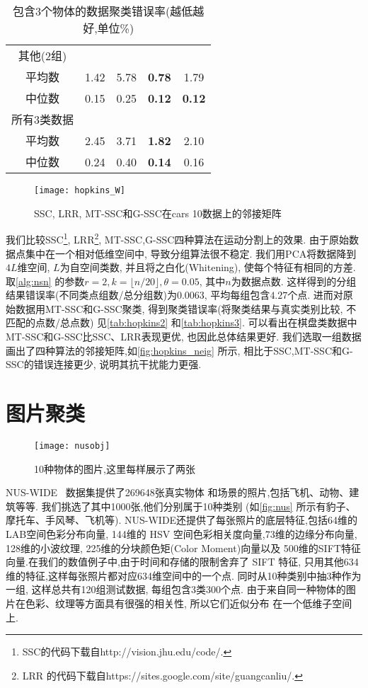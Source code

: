 \begin{table}[!htb]
\begin{tabular}{|c|c|c|c|c|}
	其他(2组)  &      &      &               &               \\
	平均数     & 1.42 & 5.78 & \textbf{0.78} & 1.79          \\
	中位数     & 0.15 & 0.25 & \textbf{0.12} & \textbf{0.12} \\ \hline
	所有3类数据  &      &      &               &               \\
	平均数     & 2.45 & 3.71 & \textbf{1.82} & 2.10 \\
    中位数     & 0.24 & 0.40 & \textbf{0.14}  & 0.16  \\ \hline
  \end{tabular}
  \caption{包含3个物体的数据聚类错误率(越低越好,单位\%)}
  \label{tab:hopkins3}
\end{table}

\begin{figure}[tb]
  \centering
  \texttt{[image: hopkins\_W]}
  \caption{SSC, LRR, MT-SSC和G-SSC在cars 10数据上的邻接矩阵}
  \label{fig:hopkins_neig}
\end{figure}
我们比较SSC\footnote{SSC的代码下载自http://vision.jhu.edu/code/.},
LRR\footnote{LRR 的代码下载自https://sites.google.com/site/guangcanliu/.},
MT-SSC,G-SSC四种算法在运动分割上的效果.
由于原始数据点集中在一个相对低维空间中, 导致分组算法很不稳定.
我们用PCA将数据降到\(4L\)维空间, \(L\)为自空间类数, 并且将之白化(Whitening),
使每个特征有相同的方差. 
取\autoref{alg:nsn} 的参数\(r=2, k=\lfloor n/20\rfloor, \theta=0.05\), 其中\(n\)为数据点数.
这样得到的分组结果错误率(不同类点组数/总分组数)为\(0.0063\),
平均每组包含\(4.27\)个点.
进而对原始数据用MT-SSC和G-SSC聚类,
得到聚类错误率(将聚类结果与真实类别比较, 不匹配的点数/总点数)
见\autoref{tab:hopkins2} 和\autoref{tab:hopkins3}. 
可以看出在棋盘类数据中MT-SSC和G-SSC比SSC、LRR表现更优, 也因此总体结果更好.
我们选取一组数据画出了四种算法的邻接矩阵,如\autoref{fig:hopkins_neig} 所示,
相比于SSC,MT-SSC和G-SSC的错误连接更少, 说明其抗干扰能力更强.

\section{图片聚类}
\begin{figure}[htb]
  \centering
  \texttt{[image: nusobj]}
  \caption{10种物体的图片,这里每样展示了两张}
  \label{fig:nus}
\end{figure}
NUS-WIDE~\cite{chua2009NUS} 数据集提供了269648张真实物体
和场景的照片,包括飞机、动物、建筑等等.
我们挑选了其中1000张,他们分别属于10种类别
(如\autoref{fig:nus} 所示有豹子、摩托车、手风琴、飞机等).
NUS-WIDE还提供了每张照片的底层特征,包括64维的LAB空间色彩分布向量,
144维的 HSV 空间色彩相关度向量,73维的边缘分布向量,
128维的小波纹理, 225维的分块颜色矩(Color Moment)向量以及
500维的SIFT特征向量.在我们的数值例子中,由于时间和存储的限制舍弃了
SIFT 特征, 只用其他634维的特征,这样每张照片都对应634维空间中的一个点.
同时从10种类别中抽3种作为一组, 这样总共有120组测试数据, 每组包含3类300个点.
由于来自同一种物体的图片在色彩、纹理等方面具有很强的相关性, 所以它们近似分布
在一个低维子空间上.

